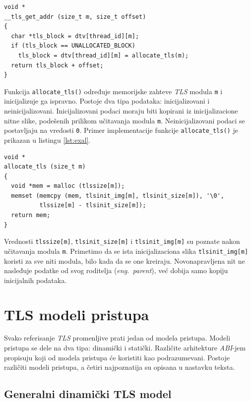 \documentclass[12pt,oneside]{memoir}
\begin{document}
\begin{lstlisting}[style=customc, label={lst:ex2}, caption={Promena implementacije funkcije \texttt{\_\_tls\_get\_addr()}}]
void *
__tls_get_addr (size_t m, size_t offset)
{
  char *tls_block = dtv[thread_id][m];
  if (tls_block == UNALLOCATED_BLOCK)
    tls_block = dtv[thread_id][m] = allocate_tls(m);
  return tls_block + offset;
}

\end{lstlisting}

Funkcija \texttt{allocate\_tls()} određuje memorijske zahteve \emph{TLS} modula \texttt{m} i inicijalizuje ga ispravno. Postoje dva tipa podataka: inicijalizovani i neinicijalizovani. Inicijalizovani podaci moraju biti kopirani iz inicijalizacione nitne slike, podešenih prilikom učitavanja modula \texttt{m}. Neinicijalizovani podaci se postavljaju na vredosti \texttt{0}. Primer implementacije funkcije \texttt{allocate\_tls()} je prikazan u listingu \ref{lst:exal}.\newpage

\begin{lstlisting}[style=customc, label={lst:exal}, caption={Implementacija funkcije \texttt{allocate\_tls()}}]
void *
allocate_tls (size_t m)
{
  void *mem = malloc (tlssize[m]);
  memset (memcpy (mem, tlsinit_img[m], tlsinit_size[m]), '\0',
          tlssize[m] - tlsinit_size[m]);
  return mem;
}

\end{lstlisting}

Vrednosti \texttt{tlssize[m]}, \texttt{tlsinit\_size[m]} i \texttt{tlsinit\_img[m]} su poznate nakon učitavanja modula \texttt{m}. Primetimo da se ista inicijalizaciona slika \texttt{tlsinit\_img[m]} koristi za sve niti modula, bilo kada da se one kreiraju. Novonapravljena nit ne nasleđuje podatke od svog roditelja (\emph{eng.~parent}), već dobija samo kopiju inicijalnih podataka.

\section{TLS modeli pristupa}
\label{sec:tlsmodeli}

Svako referisanje \emph{TLS} promenljive prati jedan od modela pristupa. Modeli pristupa se dele na dva tipa: dinamički i statički. Različite arhitekture \emph{ABI}-jem propisuju koji od modela pristupa će koristiti kao podrazumevani. Postoje različiti modeli pristupa, a četiri najpoznatija su opisana u nastavku teksta.

\subsection{Generalni dinamički TLS model}
\end{document}
